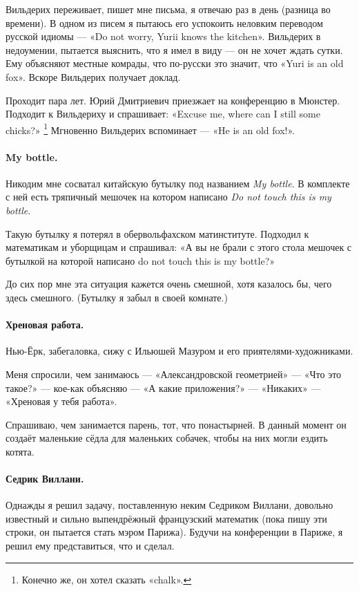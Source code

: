 \documentclass{book}
\begin{document}
Вильдерих переживает, пишет мне письма, я отвечаю раз в день (разница во времени).
В одном из писем я пытаюсь его успокоить неловким переводом русской идиомы --- «Do not worry, Yurii knows the kitchen».
Вильдерих в недоумении, пытается выяснить, что я имел в виду --- он не хочет ждать сутки.
Ему объясняют местные комрады, что по-русски это значит, что «Yuri is an old fox».
Вскоре Вильдерих получает доклад.

Проходит пара лет.
Юрий Дмитриевич приезжает на конференцию в Мюнстер.
Подходит к Вильдериху и спрашивает: «Excuse me, where can I still some chicks?»%
\footnote{Конечно же, он хотел сказать «chalk».}
Мгновенно Вильдерих вспоминает --- «He is an old fox!».

\paragraph{My bottle.}
Никодим мне сосватал китайскую бутылку под названием \textit{My bottle}.
В комплекте с ней есть тряпичный мешочек на котором написано \textit{Do not touch this is my bottle}.

Такую бутылку я потерял в обервольфахском матинституте.
Подходил к математикам и уборщицам и спрашивал: «А вы не брали с этого стола мешочек с бутылкой на которой написано do not touch this is my bottle?»

До сих пор мне эта ситуация кажется очень смешной, хотя казалось бы, чего здесь смешного.
(Бутылку я забыл в своей комнате.)

\paragraph{Хреновая работа.}
Нью-Ёрк, забегаловка, сижу с Ильюшей Мазуром и его приятелями-художниками.

Меня спросили, чем занимаюсь --- «Александровской геометрией» --- «Что это такое?» --- кое-как объясняю --- «А какие приложения?» --- «Никаких» --- «Хреновая у тебя работа».

Спрашиваю, чем занимается парень, тот, что понастырней.
В данный момент он создаёт маленькие сёдла для маленьких собачек, чтобы на них могли ездить котята.


\paragraph{Седрик Виллани.}
Однажды я решил задачу, поставленную неким Седриком Виллани, довольно известный и сильно выпендрёжный французский математик (пока пишу эти строки, он пытается стать мэром Парижа).
Будучи на конференции в Париже, я решил ему представиться, что и сделал.
\end{document}
